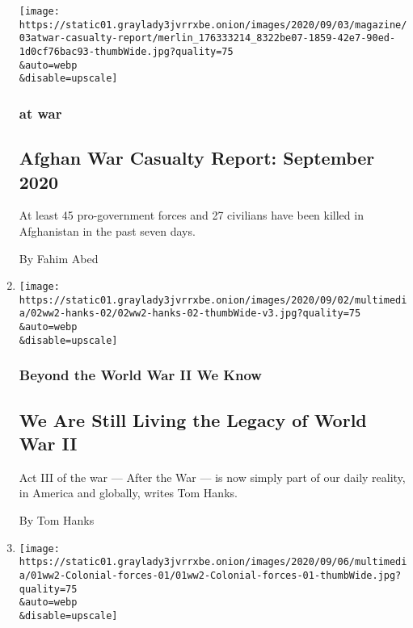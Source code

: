 \begin{enumerate}
  \texttt{[image: https://static01.graylady3jvrrxbe.onion/images/2020/09/03/magazine/03atwar-casualty-report/merlin\_176333214\_8322be07-1859-42e7-90ed-1d0cf76bac93-thumbWide.jpg?quality=75\\\&auto=webp\\\&disable=upscale]}

  \hypertarget{at-war-1}{%
  \subsubsection{at war}\label{at-war-1}}

  \hypertarget{afghan-war-casualty-report-september-2020}{%
  \subsection{Afghan War Casualty Report: September
  2020}\label{afghan-war-casualty-report-september-2020}}

  At least 45 pro-government forces and 27 civilians have been killed in
  Afghanistan in the past seven days.

  By Fahim Abed
\item
  \href{/2020/09/02/magazine/world-war-ii-end-tom-hanks.html}{}

  \texttt{[image: https://static01.graylady3jvrrxbe.onion/images/2020/09/02/multimedia/02ww2-hanks-02/02ww2-hanks-02-thumbWide-v3.jpg?quality=75\\\&auto=webp\\\&disable=upscale]}

  \hypertarget{beyond-the-world-war-ii-we-know-2}{%
  \subsubsection{Beyond the World War II We
  Know}\label{beyond-the-world-war-ii-we-know-2}}

  \hypertarget{we-are-still-living-the-legacy-of-world-war-ii}{%
  \subsection{We Are Still Living the Legacy of World War
  II}\label{we-are-still-living-the-legacy-of-world-war-ii}}

  Act III of the war --- After the War --- is now simply part of our
  daily reality, in America and globally, writes Tom Hanks.

  By Tom Hanks
\item
  \href{/2020/09/01/magazine/the-forgotten-colonial-forces-of-world-war-ii.html}{}

  \texttt{[image: https://static01.graylady3jvrrxbe.onion/images/2020/09/06/multimedia/01ww2-Colonial-forces-01/01ww2-Colonial-forces-01-thumbWide.jpg?quality=75\\\&auto=webp\\\&disable=upscale]}


\end{enumerate}
